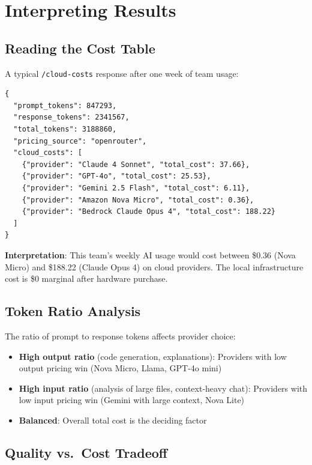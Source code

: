 \documentclass[11pt,a4paper]{article}
\begin{document}
\section{Interpreting Results}

\subsection{Reading the Cost Table}

A typical \texttt{/cloud-costs} response after one week of team usage:

\begin{lstlisting}[language={}]
{
  "prompt_tokens": 847293,
  "response_tokens": 2341567,
  "total_tokens": 3188860,
  "pricing_source": "openrouter",
  "cloud_costs": [
    {"provider": "Claude 4 Sonnet", "total_cost": 37.66},
    {"provider": "GPT-4o", "total_cost": 25.53},
    {"provider": "Gemini 2.5 Flash", "total_cost": 6.11},
    {"provider": "Amazon Nova Micro", "total_cost": 0.36},
    {"provider": "Bedrock Claude Opus 4", "total_cost": 188.22}
  ]
}
\end{lstlisting}

\textbf{Interpretation}: This team's weekly AI usage would cost between \$0.36 (Nova Micro) and \$188.22 (Claude Opus 4) on cloud providers. The local infrastructure cost is \$0 marginal after hardware purchase.

\subsection{Token Ratio Analysis}

The ratio of prompt to response tokens affects provider choice:

\begin{itemize}
  \item \textbf{High output ratio} (code generation, explanations): Providers with low output pricing win (Nova Micro, Llama, GPT-4o mini)
  \item \textbf{High input ratio} (analysis of large files, context-heavy chat): Providers with low input pricing win (Gemini with large context, Nova Lite)
  \item \textbf{Balanced}: Overall total cost is the deciding factor
\end{itemize}

\subsection{Quality vs.\ Cost Tradeoff}
\end{document}
